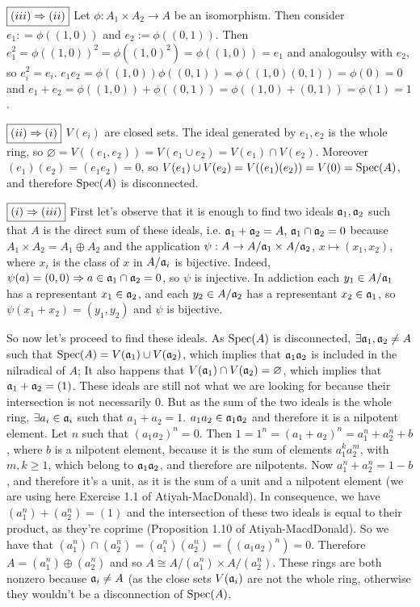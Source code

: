 \begin{sol}
	$\boxed{(iii) \Rightarrow (ii)}$ Let $\phi: A_1 \times A_2 \to A$ be an isomorphism. Then consider $e_1: = \phi((1,0))$ and $e_2 := \phi((0,1))$. Then $e_1^2 = \phi((1,0))^2 = \phi((1,0)^2) = \phi((1,0)) = e_1$ and analogoulsy with $e_2$, so $e_i^2 = e_i$. $e_1 e_2 = \phi((1,0))\phi((0,1)) = \phi((1,0)(0,1)) = \phi(0) = 0$ and $e_1 + e_2 = \phi((1,0)) + \phi((0,1)) = \phi((1,0)+ (0,1)) = \phi(1) = 1$.

	$\boxed{(ii) \Rightarrow (i)}$ $V(e_i)$ are closed sets. The ideal generated by $e_1, e_2$ is the whole ring, so $\varnothing = V((e_1,e_2)) = V(e_1 \cup e_2) = V(e_1) \cap V(e_2)$. Moreover $(e_1)(e_2) = (e_1e_2) = 0$, so $V(e_1) \cup V(e_2) = V((e_1)(e_2)) = V(0) = \mathrm{Spec}(A)$, and therefore $\mathrm{Spec}(A)$ is disconnected.

	$\boxed{(i) \Rightarrow (iii)}$ First let's observe that it is enough to find two ideals $\mathfrak{a}_1, \mathfrak{a}_2$ such that $A$ is the direct sum of these ideals, i.e. $\mathfrak{a}_1 + \mathfrak{a}_2 = A, \, \mathfrak{a}_1 \cap \mathfrak{a}_2 = 0$ because $A_1 \times A_2 = A_1 \oplus A_2$ and the application $\psi: A \to A/\mathfrak{a}_1 \times A/\mathfrak{a}_2$, $x \mapsto (x_1, x_2)$, where $x_i$ is the class of $x$ in $A/\mathfrak{a}_i$ is bijective. Indeed, $\psi(a) = (0,0) \Rightarrow a \in \mathfrak{a}_1 \cap \mathfrak{a}_2 = 0$, so $\psi$ is injective. In addiction each $y_1 \in A/\mathfrak{a}_1$ has a representant $x_1 \in \mathfrak{a}_2$, and each $y_2 \in A/\mathfrak{a}_2$ has a representant $x_2 \in \mathfrak{a}_1$, so $\psi(x_1+x_2) = (y_1, y_2)$ and $\psi$ is bijective.

	So now let's proceed to find these ideals. As $\mathrm{Spec}(A)$ is disconnected, $\exists \mathfrak{a}_1, \mathfrak{a}_2 \neq A$ such that $\mathrm{Spec}(A) = V(\mathfrak{a}_1) \cup V(\mathfrak{a}_2)$, which implies that $\mathfrak{a}_1 \mathfrak{a}_2$ is included in the nilradical of $A$; It also happens that $V(\mathfrak{a}_1) \cap V(\mathfrak{a}_2) = \varnothing$, which implies that $\mathfrak{a}_1 + \mathfrak{a}_2 = (1)$. These ideals are still not what we are looking for because their intersection is not necessarily $0$. But as the sum of the two ideals is the whole ring, $\exists a_i \in \mathfrak{a}_i$ such that $a_1 + a_2 = 1$. $a_1a_2 \in \mathfrak{a}_1 \mathfrak{a}_2$ and therefore it is a nilpotent element. Let $n$ such that $(a_1a_2)^n = 0$. Then $1 = 1^n = (a_1+a_2)^n = a_1^n + a_2^n + b$, where $b$ is a nilpotent element, because it is the sum of elements $a_1^k a_2^m$, with $m, k \geq 1$, which belong to $\mathfrak{a}_1 \mathfrak{a}_2$, and therefore are nilpotents. Now $a_1^n + a_2^n = 1-b$, and therefore it's a unit, as it is the sum of a unit and a nilpotent element (we are using here Exercise 1.1 of Atiyah-MacDonald). In consequence, we have $(a_1^n) + (a_2^n) = (1)$ and the intersection of these two ideals is equal to their product, as they're coprime (Proposition 1.10 of Atiyah-MacdDonald). So we have that $(a_1^n) \cap (a_2^n) = (a_1^n)(a_2^n) = ((a_1a_2)^n) = 0$. Therefore $A = (a_1^n) \oplus (a_2^n)$ and so $A \cong A/(a_1^n) \times A/(a_2^n)$. These rings are both nonzero because $\mathfrak{a}_i \neq A$ (as the close sets $V(\mathfrak{a}_i)$ are not the whole ring, otherwise they wouldn't be a disconnection of $\mathrm{Spec}(A)$.

\end{sol}